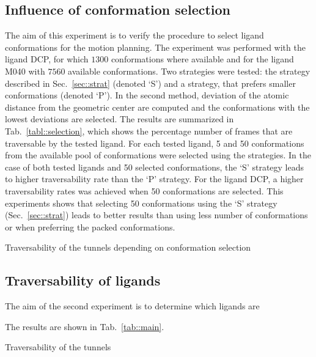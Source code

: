 \documentclass[usletter, 10pt, conference]{ieeeconf} %
\begin{document}
\subsection{Influence of conformation selection}

The aim of this experiment is to verify the procedure to select ligand conformations for the motion planning.
The experiment was performed with the ligand DCP, for which $1300$ conformations where available and for the ligand
M040 with $7560$ available conformations.
Two strategies were tested: the strategy described in Sec.~\ref{sec::strat} (denoted `S') and a strategy,
that prefers smaller conformations (denoted `P').
In the second method, deviation of the atomic distance from the geometric center are computed and the conformations
with the lowest deviations are selected.
The results are summarized in Tab.~\ref{tabl::selection}, which shows the percentage number of frames that are traversable by the tested ligand.
For each tested ligand, 5 and 50 conformations from the available pool of conformations were selected using the strategies.
In the case of both tested ligands and 50 selected conformations, the `S' strategy leads to higher traversability rate than the `P' strategy.
For the ligand DCP, a higher traversability rates was achieved when 50 conformations are selected.
This experiments shows that selecting 50 conformations using the `S' strategy (Sec.~\ref{sec::strat}) leads to better results
than using less number of conformations or when preferring the packed conformations.

\begin{table}
\centering
\caption{\label{tab::selection}Traversability of the tunnels depending on conformation selection}
\small
\renewcommand{\tabcolsep}{3pt}
{\small

}
\end{table}





\subsection{Traversability of ligands}

The aim of the second experiment is to determine which ligands are 

The results are shown in Tab.~\ref{tab::main}.


\begin{table}
\centering
\caption{\label{tab::main}Traversability of the tunnels}
\small
\renewcommand{\tabcolsep}{3pt}
{\small

}
\end{table}
\end{document}

